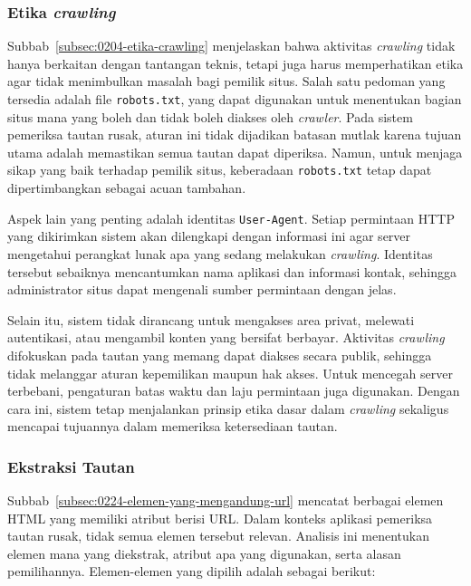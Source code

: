 \subsubsection*{Etika \textit{crawling}}
Subbab~\ref{subsec:0204-etika-crawling} menjelaskan bahwa aktivitas \textit{crawling} tidak hanya berkaitan dengan tantangan teknis, tetapi juga harus memperhatikan etika agar tidak menimbulkan masalah bagi pemilik situs. Salah satu pedoman yang tersedia adalah file \texttt{robots.txt}, yang dapat digunakan untuk menentukan bagian situs mana yang boleh dan tidak boleh diakses oleh \textit{crawler}. Pada sistem pemeriksa tautan rusak, aturan ini tidak dijadikan batasan mutlak karena tujuan utama adalah memastikan semua tautan dapat diperiksa. Namun, untuk menjaga sikap yang baik terhadap pemilik situs, keberadaan \texttt{robots.txt} tetap dapat dipertimbangkan sebagai acuan tambahan.  

Aspek lain yang penting adalah identitas \texttt{User-Agent}. Setiap permintaan HTTP yang dikirimkan sistem akan dilengkapi dengan informasi ini agar server mengetahui perangkat lunak apa yang sedang melakukan \textit{crawling}. Identitas tersebut sebaiknya mencantumkan nama aplikasi dan informasi kontak, sehingga administrator situs dapat mengenali sumber permintaan dengan jelas.  

Selain itu, sistem tidak dirancang untuk mengakses area privat, melewati autentikasi, atau mengambil konten yang bersifat berbayar. Aktivitas \textit{crawling} difokuskan pada tautan yang memang dapat diakses secara publik, sehingga tidak melanggar aturan kepemilikan maupun hak akses. Untuk mencegah server terbebani, pengaturan batas waktu dan laju permintaan juga digunakan. Dengan cara ini, sistem tetap menjalankan prinsip etika dasar dalam \textit{crawling} sekaligus mencapai tujuannya dalam memeriksa ketersediaan tautan.


\subsubsection*{Ekstraksi Tautan}
Subbab~\ref{subsec:0224-elemen-yang-mengandung-url} mencatat berbagai elemen HTML yang memiliki atribut berisi URL. Dalam konteks aplikasi pemeriksa tautan rusak, tidak semua elemen tersebut relevan. Analisis ini menentukan elemen mana yang diekstrak, atribut apa yang digunakan, serta alasan pemilihannya. Elemen-elemen yang dipilih adalah sebagai berikut:

